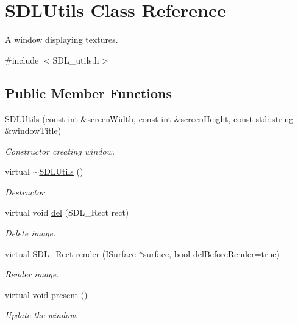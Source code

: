 \hypertarget{class_s_d_l_utils}{}\section{S\+D\+L\+Utils Class Reference}
\label{class_s_d_l_utils}


A window displaying textures.  




{\ttfamily \#include $<$S\+D\+L\+\_\+utils.\+h$>$}

\subsection*{Public Member Functions}
\begin{DoxyCompactItemize}
\item 
\mbox{\hyperlink{class_s_d_l_utils_a53e5b8a0018c3d96af3ad413b2272f3d}{S\+D\+L\+Utils}} (const int \&screen\+Width, const int \&screen\+Height, const std\+::string \&window\+Title)
\begin{DoxyCompactList}\small\item\em Constructor creating window. \end{DoxyCompactList}\item 
virtual \mbox{\hyperlink{class_s_d_l_utils_a4530f05f7fdf2495a63ff1e9fc553680}{$\sim$\+S\+D\+L\+Utils}} ()
\begin{DoxyCompactList}\small\item\em Destructor. \end{DoxyCompactList}\item 
virtual void \mbox{\hyperlink{class_s_d_l_utils_a8dfdc8f41938c2c53ac5121c10eb1638}{del}} (S\+D\+L\+\_\+\+Rect rect)
\begin{DoxyCompactList}\small\item\em Delete image. \end{DoxyCompactList}\item 
virtual S\+D\+L\+\_\+\+Rect \mbox{\hyperlink{class_s_d_l_utils_a5b0a6dd7f5f0b8bd7a06527c39d8a666}{render}} (\mbox{\hyperlink{class_i_surface}{I\+Surface}} $\ast$surface, bool del\+Before\+Render=true)
\begin{DoxyCompactList}\small\item\em Render image. \end{DoxyCompactList}\item 
virtual void \mbox{\hyperlink{class_s_d_l_utils_a0e9c4b007ae61772a1c41592877b30ab}{present}} ()
\begin{DoxyCompactList}\small\item\em Update the window. \end{DoxyCompactList}\end{DoxyCompactItemize}


